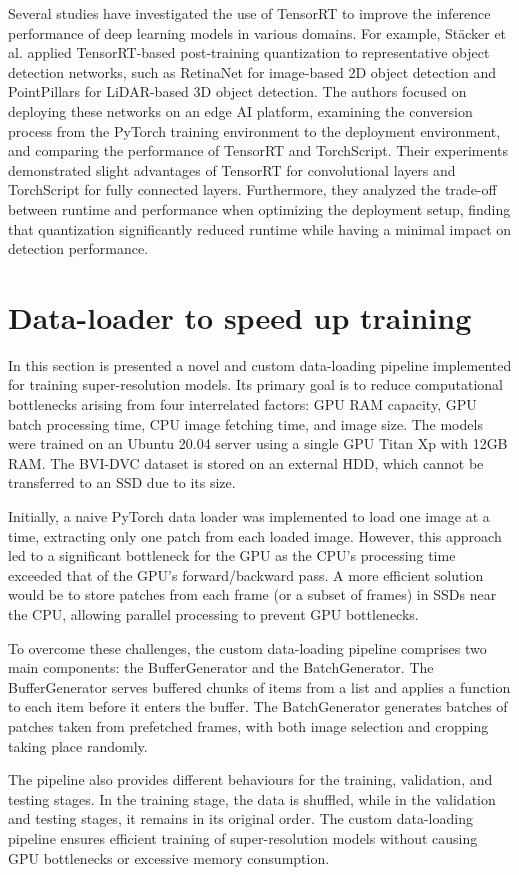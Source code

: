 Several studies have investigated the use of TensorRT to improve the inference performance of deep learning models in various domains. For example, St\"acker et al. \cite{stacker2021deployment} applied TensorRT-based post-training quantization to representative object detection networks, such as RetinaNet for image-based 2D object detection and PointPillars for LiDAR-based 3D object detection. The authors focused on deploying these networks on an edge AI platform, examining the conversion process from the PyTorch training environment to the deployment environment, and comparing the performance of TensorRT and TorchScript. Their experiments demonstrated slight advantages of TensorRT for convolutional layers and TorchScript for fully connected layers. Furthermore, they analyzed the trade-off between runtime and performance when optimizing the deployment setup, finding that quantization significantly reduced runtime while having a minimal impact on detection performance.

\section{Data-loader to speed up training}
\label{sec:dataloader}

In this section is presented a novel and custom data-loading pipeline implemented for training super-resolution models. Its primary goal is to reduce computational bottlenecks arising from four interrelated factors: GPU RAM capacity, GPU batch processing time, CPU image fetching time, and image size. The models were trained on an Ubuntu 20.04 server using a single GPU Titan Xp with 12GB RAM. The BVI-DVC dataset is stored on an external HDD, which cannot be transferred to an SSD due to its size.

Initially, a naive PyTorch data loader was implemented to load one image at a time, extracting only one patch from each loaded image. However, this approach led to a significant bottleneck for the GPU as the CPU's processing time exceeded that of the GPU's forward/backward pass. A more efficient solution would be to store patches from each frame (or a subset of frames) in SSDs near the CPU, allowing parallel processing to prevent GPU bottlenecks.

To overcome these challenges, the custom data-loading pipeline comprises two main components: the BufferGenerator and the BatchGenerator. The BufferGenerator serves buffered chunks of items from a list and applies a function to each item before it enters the buffer. The BatchGenerator generates batches of patches taken from prefetched frames, with both image selection and cropping taking place randomly.

The pipeline also provides different behaviours for the training, validation, and testing stages. In the training stage, the data is shuffled, while in the validation and testing stages, it remains in its original order. The custom data-loading pipeline ensures efficient training of super-resolution models without causing GPU bottlenecks or excessive memory consumption.
